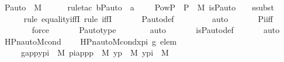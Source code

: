 \begin{isabellebody}
\ {\isachardoublequoteopen}P{\isacharunderscore}{\kern0pt}auto\ {\isasymin}\ M{\isachardoublequoteclose}\ \isanewline
\ \ \ \ \isamarkupfalse%
{\isacharparenleft}{\kern0pt}rule{\isacharunderscore}{\kern0pt}tac\ b{\isacharequal}{\kern0pt}P{\isacharunderscore}{\kern0pt}auto\ \ a\ {\isacharequal}{\kern0pt}\ {\isachardoublequoteopen}{\isacharbraceleft}{\kern0pt}\ {\isasympi}\ {\isasymin}\ Pow{\isacharparenleft}{\kern0pt}P\ {\isasymtimes}\ P{\isacharparenright}{\kern0pt}\ {\isasyminter}\ M{\isachardot}{\kern0pt}\ is{\isacharunderscore}{\kern0pt}P{\isacharunderscore}{\kern0pt}auto{\isacharparenleft}{\kern0pt}{\isasympi}{\isacharparenright}{\kern0pt}\ {\isacharbraceright}{\kern0pt}\ {\isachardoublequoteclose}\ \ ssubst{\isacharparenright}{\kern0pt}\ \isanewline
\ \ \ \ \ \isamarkupfalse%
{\isacharparenleft}{\kern0pt}rule\ equality{\isacharunderscore}{\kern0pt}iffI{\isacharsemicolon}{\kern0pt}\ rule\ iffI{\isacharparenright}{\kern0pt}\ \isanewline
\ \ \ \ \isamarkupfalse%
\ P{\isacharunderscore}{\kern0pt}auto{\isacharunderscore}{\kern0pt}def\ \isanewline
\ \ \ \ \ \ \isamarkupfalse%
\ auto\ \isanewline
\ \ \ \ \isamarkupfalse%
\ Pi{\isacharunderscore}{\kern0pt}iff\ \isanewline
\ \ \ \ \ \ \isamarkupfalse%
\ force\ \isanewline
\ \ \ \ \isamarkupfalse%
\ P{\isacharunderscore}{\kern0pt}auto{\isacharunderscore}{\kern0pt}type\ \isanewline
\ \ \ \ \ \isamarkupfalse%
\ auto\ \isanewline
\ \ \ \ \isamarkupfalse%
\ is{\isacharunderscore}{\kern0pt}P{\isacharunderscore}{\kern0pt}auto{\isacharunderscore}{\kern0pt}def\ \isanewline
\ \ \ \ \isamarkupfalse%
\ auto\isanewline
{}\isamarkupfalse%
%
\endisatagproof
{\isafoldproof}%
%
\isadelimproof
\isanewline
%
\endisadelimproof
\isanewline
{}\isamarkupfalse%
\ HPn{\isacharunderscore}{\kern0pt}auto{\isacharunderscore}{\kern0pt}M{\isacharunderscore}{\kern0pt}cond\ \ \isanewline
\ \ {\isachardoublequoteopen}HPn{\isacharunderscore}{\kern0pt}auto{\isacharunderscore}{\kern0pt}M{\isacharunderscore}{\kern0pt}cond{\isacharparenleft}{\kern0pt}x{\isacharunderscore}{\kern0pt}pi{\isacharcomma}{\kern0pt}\ g{\isacharcomma}{\kern0pt}\ elem{\isacharparenright}{\kern0pt}\ {\isasymequiv}\ \isanewline
\ \ \ \ \ {\isacharparenleft}{\kern0pt}{\isasymexists}g{\isacharunderscore}{\kern0pt}app{\isacharunderscore}{\kern0pt}y{\isacharunderscore}{\kern0pt}pi\ {\isasymin}\ M{\isachardot}{\kern0pt}\ {\isasymexists}pi{\isacharunderscore}{\kern0pt}app{\isacharunderscore}{\kern0pt}p\ {\isasymin}\ M{\isachardot}{\kern0pt}\ {\isasymexists}y{\isacharunderscore}{\kern0pt}p\ {\isasymin}\ M{\isachardot}{\kern0pt}\ {\isasymexists}y{\isacharunderscore}{\kern0pt}pi\ {\isasymin}\ M{\isachardot}{\kern0pt}\ \isanewline

\end{isabellebody}

